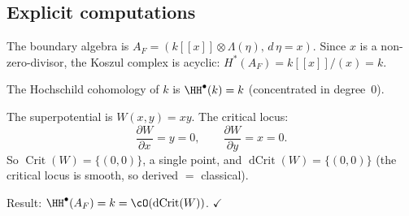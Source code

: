 \subsection{Explicit computations}

\begin{computation}[Smooth point: $F(x) = x$]
\label{comp:lg-smooth}
The boundary algebra is
$A_F = (k[[x]] \otimes \Lambda(\eta),\, d\,\eta = x)$.
Since $x$ is a non-zero-divisor, the Koszul complex is acyclic:
$H^*(A_F) = k[[x]]/(x) = k$.

The Hochschild cohomology of $k$ is $\HH^\bullet(k) = k$
(concentrated in degree~$0$).

The superpotential is $W(x,y) = xy$. The critical locus:
\[
\frac{\partial W}{\partial x} = y = 0, \qquad
\frac{\partial W}{\partial y} = x = 0.
\]
So $\operatorname{Crit}(W) = \{(0,0)\}$, a single point,
and $\operatorname{dCrit}(W) = \{(0,0)\}$ (the critical locus
is smooth, so derived $=$ classical).

Result: $\HH^\bullet(A_F) = k = \cO(\operatorname{dCrit}(W))$.
\hfill$\checkmark$
\end{computation}


